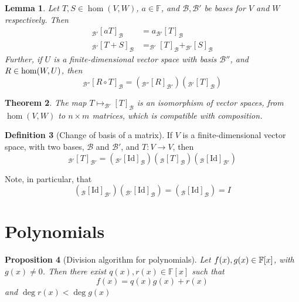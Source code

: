 \documentclass[10pt,fleqn]{article}
\newcommand{\id}{\mathrm{Id}}
\newcommand{\field}{\mathbb{F}}
\newcommand{\basis}{\mathcal{B}}
\theoremstyle{definition} \newtheorem{defn}{Definition}[section]
\theoremstyle{plain}      \newtheorem{thm}[defn]{Theorem}
\theoremstyle{plain}      \newtheorem{prop}[defn]{Proposition}
\theoremstyle{plain}      \newtheorem{lem}[defn]{Lemma}
\theoremstyle{plain}      \newtheorem{cor}[defn]{Corollary}
\theoremstyle{plain}      \newtheorem{ad}[defn]{Addendum}
\theoremstyle{definition} \newtheorem{ex}[defn]{Example}
\theoremstyle{definition} \newtheorem{rem}[defn]{Remark}
\numberwithin{equation}{subsection}
\begin{document}
\begin{lem}
    Let $T,S\in\hom(V,W)$, $a\in\field$, and $\basis,\basis'$ be bases for $V$ and $W$ respectively.
    Then
    \begin{align*}
        _{\basis'}[aT]_{\basis}
        &=
        a_{\basis'}[T]_{\basis}\\
        _{\basis'}[T+S]_{\basis}
        &=
        _{\basis'}[T]_{\basis}+_{\basis'}[S]_{\basis}
    \end{align*}
    Further, if $U$ is a finite-dimensional vector space with basis $\basis''$, and $R\in\nobreak\hom(W,U)$, then
    \[
        _{\basis''}[R\circ T]_{\basis}=
        (_{\basis''}[R]_{\basis'})(_{\basis'}[T]_{\basis})
    \]
\end{lem}

\begin{thm}
    The map $T\mapsto_{\basis'}[T]_{\basis}$ is an isomorphism of vector spaces, from $\hom(V,W)$ to $n\times m$ matrices, which is compatible with composition.
\end{thm}

\begin{defn}[Change of basis of a matrix]
    If $V$ is a finite-dimensional vector space, with two bases, $\basis$ and $\basis'$, and $T:V\to V$, then
    \[
        _{\basis'}[T]_{\basis'}=
        (_{\basis'}[\id]_{\basis})(_{\basis}[T]_{\basis})(_{\basis}[\id]_{\basis'})
    \]

    Note, in particular, that
    \[
        (_{\basis}[\id]_{\basis'})(_{\basis'}[\id]_{\basis})=
        (_{\basis}[\id]_{\basis})=
        I
    \]
\end{defn}


\section{Polynomials}

\begin{prop}[Division algorithm for polynomials]
    Let $f(x),g(x)\in\nobreak\field[x]$, with $g(x)\neq0$.
    Then there exist $q(x),r(x)\in\field[x]$ such that
    \[
        f(x)=q(x)g(x)+r(x)
    \]
    and $\deg r(x)<\deg g(x)$
\end{prop}
\end{document}

